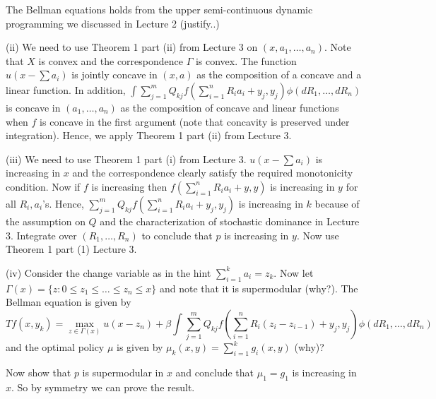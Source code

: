 \documentclass[letter,11pt]{article}
\begin{document}
The Bellman equations holds from the upper semi-continuous dynamic programming we discussed in Lecture 2 (justify..)

(ii) We need to use Theorem 1 part (ii) from Lecture 3  on $(x,a_{1},\ldots,a_{n})$. Note that $X$ is convex and the correspondence $\Gamma$ is convex. The function $u(x-\sum a_{i})$ is jointly concave in $(x,a)$ as the composition of a concave and a linear function. In addition, $\int  \sum _{j=1}^{m} Q_{kj} f \left ( \sum_{i=1}^{n} R_{i} a_{i} +y_{j} , y_{j} \right )  \phi(dR_{1},\ldots,dR_{n})$ is concave in $(a_{1},\ldots,a_{n})$ as the composition of concave and linear functions when $f$ is concave in the first argument (note that concavity is preserved under integration). Hence, we apply   Theorem 1  part (ii) from Lecture 3. 

(iii) We need to use Theorem 1 part (i) from Lecture 3. $u(x-\sum a_{i})$ is increasing in $x$ and the correspondence clearly satisfy the required monotonicity condition. Now if $f$ is increasing then $f \left ( \sum_{i=1}^{n} R_{i} a_{i} +y , y \right )$ is increasing in $y$ for all $R_{i},a_{i}$'s. Hence, $\sum _{j=1}^{m} Q_{kj}   f \left ( \sum_{i=1}^{n} R_{i} a_{i} +y_{j} , y_{j} \right )$ is increasing in $k$ because of the assumption on $Q$ and the characterization of stochastic dominance in Lecture 3. Integrate over $(R_{1},\ldots,R_{n})$ to conclude that $p$ is increasing in $y$. Now use Theorem 1 part (1) Lecture 3. 

(iv) Consider the change variable as in the hint $\sum _{i=1}^{k} a_{i} = z_{k}$. Now 
let $\Gamma(x) = \{z: 0 \leq z_{1} \leq \ldots \leq z_{n} \leq x \}$ and note that it is supermodular (why?). The Bellman equation is given by
$$Tf(x,y_{k}) = \max _{z \in \Gamma(x)} u \left (x- z_{n} \right ) + \beta \int  \sum _{j=1}^{m} Q_{kj} f \left ( \sum_{i=1}^{n} R_{i} (z_{i} - z_{i-1}) +y_{j} , y_{j} \right ) \phi(dR_{1},\ldots,dR_{n})$$ and the optimal policy $\mu$ is given by
 $\mu_{k} (x,y) = \sum _{i=1}^{k} g_{i}(x,y)$ (why)?

Now show that $p$ is supermodular in $x$ and conclude that $\mu_{1} = g_{1}$ is increasing in $x$. So by symmetry we can prove the result. 
\end{document}
